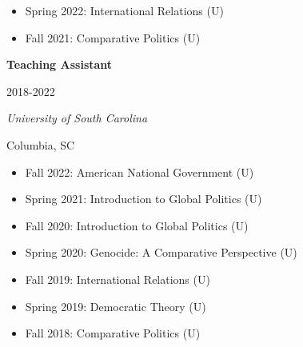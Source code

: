 \documentclass[
  16,
]{article}
\providecommand{\tightlist}{%
  \setlength{\itemsep}{0pt}\setlength{\parskip}{0pt}}\usepackage{longtable,booktabs,array}
\begin{document}
\begin{itemize}
\tightlist
\item
  Spring 2022: International Relations (U)
\item
  Fall 2021: Comparative Politics (U)
\end{itemize}

\vspace{7pt}

\begin{large}
  \begin{multicols}{2}
    \begin{flushleft}{\bf Teaching Assistant}\end{flushleft}
    \begin{flushright}2018-2022\end{flushright}
  \end{multicols}
  \vspace{-0.17cm}
  \begin{multicols}{2}
    \begin{flushleft}\textit{University of South Carolina}\end{flushleft}
    \begin{flushright}Columbia, SC\end{flushright}
  \end{multicols}
  \end{large}
\vspace{-0.16cm}

\begin{itemize}
\tightlist
\item
  Fall 2022: American National Government (U)
\item
  Spring 2021: Introduction to Global Politics (U)
\item
  Fall 2020: Introduction to Global Politics (U)
\item
  Spring 2020: Genocide: A Comparative Perspective (U)
\item
  Fall 2019: International Relations (U)
\item
  Spring 2019: Democratic Theory (U)
\item
  Fall 2018: Comparative Politics (U)
\end{itemize}

\vspace{7pt}
\end{document}
